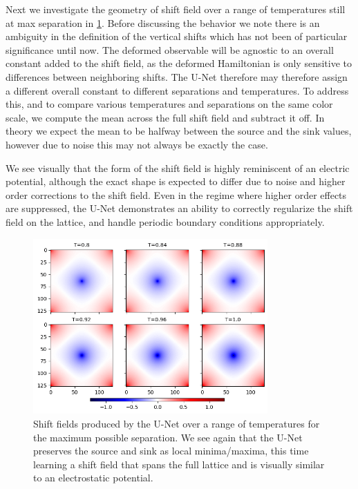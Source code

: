 \documentclass[12pt]{article}
\begin{document}
Next we investigate the geometry of shift field over a range of temperatures still at max separation in \ref{fig:unet_max_shifts}. Before discussing the behavior we note 
there is an ambiguity in the definition of the vertical shifts which has not been of particular significance until now. The deformed observable will be agnostic to 
an overall constant added to the shift field, as the deformed Hamiltonian is only sensitive to differences between neighboring shifts. The U-Net therefore may therefore 
assign a different overall constant to different separations and temperatures. To address this, and to compare various temperatures and separations on the same color scale, 
we compute the mean across the full shift field and subtract it off. In theory we expect the mean to be halfway between the source and the sink values, however due to
noise this may not always be exactly the case.

We see visually that the form of the shift field is highly reminiscent of an electric potential, although the exact shape is expected to differ due to noise and higher
order corrections to the shift field. Even in the regime where higher order effects are suppressed, the U-Net demonstrates an ability to
correctly regularize the shift field on the lattice, and handle periodic boundary conditions appropriately.

\begin{figure}
	\centering
	\includegraphics[width=0.8\textwidth]{figures/unet_max_shifts.png}
	\caption[U-Net Max Shifts]{Shift fields produced by the U-Net over a range of temperatures for the maximum possible separation. We see again
	that the U-Net preserves the source and sink as local minima/maxima, this time learning a shift field that spans the full lattice and is
	visually similar to an electrostatic potential.}
	\label{fig:unet_max_shifts}
\end{figure}
\end{document}
